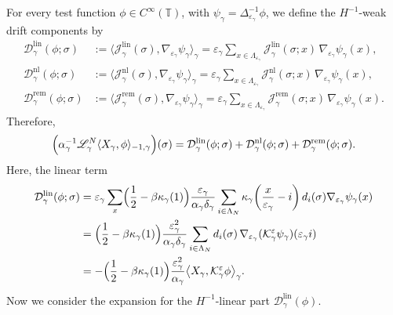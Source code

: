 \documentclass{article}
\begin{document}
For every test function \(\phi\in C^\infty(\mathbb T)\), with \(\psi_\gamma=\Delta_{\varepsilon_\gamma}^{-1}\phi\), we define the \(H^{-1}\)-weak drift components by
\begin{align*}
\mathcal D_\gamma^{\mathrm{lin}}(\phi;\sigma)
&:=
\bigl\langle \mathcal J_\gamma^{\mathrm{lin}}(\sigma),\nabla_{\varepsilon_\gamma}\psi_\gamma\bigr\rangle_\gamma
=
\varepsilon_\gamma\sum_{x\in\Lambda_{\varepsilon_\gamma}}
\mathcal J_\gamma^{\mathrm{lin}}(\sigma;x)\,
\nabla_{\varepsilon_\gamma}\psi_\gamma(x),\\
\mathcal D_\gamma^{\mathrm{nl}}(\phi;\sigma)
&:=
\bigl\langle \mathcal J_\gamma^{\mathrm{nl}}(\sigma),\nabla_{\varepsilon_\gamma}\psi_\gamma\bigr\rangle_\gamma
=
\varepsilon_\gamma\sum_{x\in\Lambda_{\varepsilon_\gamma}}
\mathcal J_\gamma^{\mathrm{nl}}(\sigma;x)\,
\nabla_{\varepsilon_\gamma}\psi_\gamma(x),\\
\mathcal D_\gamma^{\mathrm{rem}}(\phi;\sigma)
&:=
\bigl\langle \mathcal J_\gamma^{\mathrm{rem}}(\sigma),\nabla_{\varepsilon_\gamma}\psi_\gamma\bigr\rangle_\gamma
=
\varepsilon_\gamma\sum_{x\in\Lambda_{\varepsilon_\gamma}}
\mathcal J_\gamma^{\mathrm{rem}}(\sigma;x)\,
\nabla_{\varepsilon_\gamma}\psi_\gamma(x).
\end{align*}
Therefore,
\[
\Bigl(\alpha_\gamma^{-1}\mathscr L_\gamma^N\langle X_\gamma,\phi\rangle_{-1,\gamma}\Bigr)(\sigma)
=
\mathcal D_\gamma^{\mathrm{lin}}(\phi;\sigma)
+
\mathcal D_\gamma^{\mathrm{nl}}(\phi;\sigma)
+
\mathcal D_\gamma^{\mathrm{rem}}(\phi;\sigma).
\]
Here, the linear term
\begin{align}\label{eq:Dlin-correct-start}
\mathcal D_\gamma^{\mathrm{lin}}(\phi;\sigma)
&=
\varepsilon_\gamma\sum_{x} \Bigl(\frac12-\beta\kappa_\gamma(1)\Bigr)
\frac{\varepsilon_\gamma}{\alpha_\gamma\delta_\gamma}
\sum_{i\in\Lambda_N}
\kappa_\gamma\!\left(\frac{x}{\varepsilon_\gamma}-i\right)d_i(\sigma) \nabla_{\varepsilon_\gamma}\psi_\gamma(x)\notag\\
&=
\Bigl(\frac12-\beta\kappa_\gamma(1)\Bigr)
\frac{\varepsilon_\gamma^2}{\alpha_\gamma\delta_\gamma}
\sum_{i\in\Lambda_N}
d_i(\sigma)\,
\nabla_{\varepsilon_\gamma}(\mathcal K_\gamma^\varepsilon\psi_\gamma)(\varepsilon_\gamma i)  \nonumber \\
&= -\Bigl(\frac12-\beta\kappa_\gamma(1)\Bigr)
\frac{\varepsilon_\gamma^2}{\alpha_\gamma}
\bigl\langle X_\gamma,\mathcal K_\gamma^\varepsilon\phi\bigr\rangle_\gamma .
\end{align}
Now we consider the expansion for the \(H^{-1}\)-linear part $\mathcal D_\gamma^{\mathrm{lin}}(\phi)$.
\end{document}
